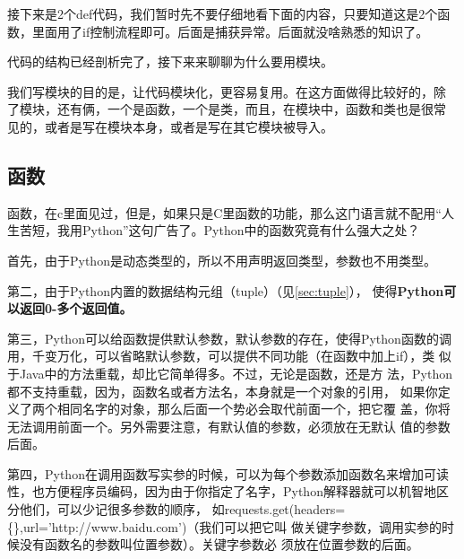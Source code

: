 \documentclass[11pt,UTF8,oneside]{mybook}
\begin{document}

接下来是2个def代码，我们暂时先不要仔细地看下面的内容，只要知道这是2个函
数，里面用了if控制流程即可。后面是捕获异常。后面就没啥熟悉的知识了。

代码的结构已经剖析完了，接下来来聊聊为什么要用模块。

我们写模块的目的是，让代码模块化，更容易复用。在这方面做得比较好的，除
了模块，还有俩，一个是函数，一个是类，而且，在模块中，函数和类也是很常
见的，或者是写在模块本身，或者是写在其它模块被导入。

\subsection{函数}
\label{sec:function}
函数，在c里面见过，但是，如果只是C里函数的功能，那么这门语言就不配用“人
生苦短，我用Python”这句广告了。Python中的函数究竟有什么强大之处？

首先，由于Python是动态类型的，所以不用声明返回类型，参数也不用类型。

第二，由于Python内置的数据结构元组（tuple）（见\autoref{sec:tuple}），
使得\textbf{Python可以返回0-多个返回值。}

第三，Python可以给函数提供默认参数，默认参数的存在，使得Python函数的调
用，千变万化，可以省略默认参数，可以提供不同功能（在函数中加上if），类
似于Java中的方法重载，却比它简单得多。不过，无论是函数，还是方
法，Python都不支持重载，因为，函数名或者方法名，本身就是一个对象的引用，
如果你定义了两个相同名字的对象，那么后面一个势必会取代前面一个，把它覆
盖，你将无法调用前面一个。另外需要注意，有默认值的参数，必须放在无默认
值的参数后面。

第四，Python在调用函数写实参的时候，可以为每个参数添加函数名来增加可读
性，也方便程序员编码，因为由于你指定了名字，Python解释器就可以机智地区
分他们，可以少记很多参数的顺序，
如requests.get(headers=\{\},url='http://www.baidu.com')（我们可以把它叫
做关键字参数，调用实参的时候没有函数名的参数叫位置参数）。关键字参数必
须放在位置参数的后面。



\end{document}
